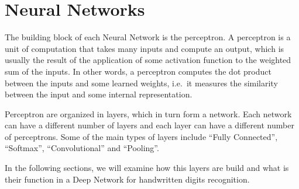 \section{Neural Networks}
\label{sec:nn}

The building block of each Neural Network is the perceptron.
A perceptron is a unit of computation that takes many inputs and compute an output, which is usually the result of the application of some activation function to the weighted sum of the inputs.
In other words, a perceptron computes the dot product between the inputs and some learned weights, i.e.\ it measures the similarity between the input and some internal representation.

Perceptron are organized in layers, which in turn form a network.
Each network can have a different number of layers and each layer can have a different number of perceptrons.
Some of the main types of layers include ``Fully Connected'', ``Softmax'', ``Convolutional'' and ``Pooling''.

In the following sections, we will examine how this layers are build and what is their function in a Deep Network for handwritten digits recognition.
